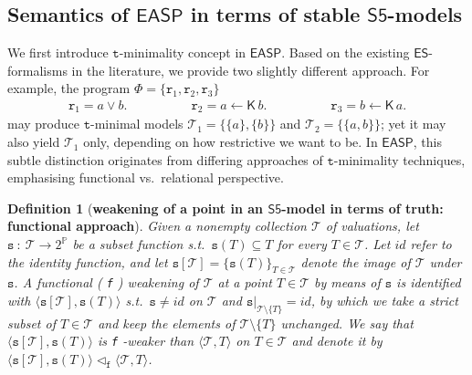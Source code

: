 \documentclass[submission,copyright,creativecommons]{eptcs}
\newcommand{\tuple}[1]  { \langle #1 \rangle }
\newcommand{\Prop}  { \mathbb{P} }
\newcommand\restr[2]  { \ensuremath{\left.#1\right|_{#2}} }
\newcommand{\suchthat}  { \ : \ }
\newcommand{\set}[1]  { \{ #1 \} }
\newcommand{\bigset}[1]  { \big\{ #1 \big\} }
\newcommand{\logic}[1]  { \ensuremath{\mathsf{#1}} }
\newcommand{\sfive}  { \logic{S5} }
\newcommand{\ES}  { \logic{ES} }
\newcommand{\EASP}  { \logic{EASP} }
\newcommand{\K}  { \mathsf{K} }
\newcommand{\weak}  { \texttt{s} }
\newcommand{\functional}  { \texttt{f} }
\newtheorem{definition}{Definition}
\begin{document}
\subsection{Semantics of \texorpdfstring{$\EASP$}{EASP} in terms of stable 
\texorpdfstring{$\sfive$}{sfive}-models}
\label{sec:Semantics.EpisASP.epistemic stable models}
We first introduce $\texttt{t}$-minimality concept in $\EASP$. Based on the existing 
$\ES$-formalisms in the literature, we provide two slightly different approach.
For example, the program $\Phi=\set{\mathtt{r}_1,\mathtt{r}_2,\mathtt{r}_3}$
\begin{align}
\label{ex: t-minimality slight difference}
\mathtt{r}_1 = a \lor b. \hspace{5em}
\mathtt{r}_2 = a \leftarrow \K\,b. \hspace{5em}
\mathtt{r}_3 = b \leftarrow \K\,a.
\end{align}
may produce $\texttt{t}$-minimal models 
$\mathcal T_1 = \set{ \set a , \set b }$ and $\mathcal T_2 = \set{ \set{a, b} }$; yet
it may also yield $\mathcal T_1$ only, depending on how restrictive we want to be.
In $\EASP$, this subtle distinction originates from differing approaches
of $\texttt{t}$-minimality techniques, 
emphasising functional vs.\ relational perspective.
%
\begin{definition}[\textbf{weakening of a point in an $\sfive$-model
in terms of truth: functional approach}]
\label{defn:weakening w.r.t. truth-functional} \normalfont
Given a nonempty collection $\mathcal T$ 
of valuations, let $\weak {\suchthat} \mathcal T \rightarrow 2^{\Prop}$ 
be a \emph{subset} 
function s.t.\ $\weak(T) \subseteq T$ for every $T \in \mathcal T$. 
Let $id$ refer to the identity function, and let
$\weak[\mathcal T]=\bigset{\weak(T)}_{\scriptscriptstyle{T\in \mathcal T}}$
denote the image of $\mathcal T$ under $\weak$.
A \emph{functional (\functional) weakening} of $\mathcal T$ 
at a point $T \in \mathcal T$ 
by means of $\weak$ is identified with $\tuple{\weak[\mathcal T], \weak(T)}$
s.t.\ $\weak \neq id$ on $\mathcal T$ and
$\restr{\weak}{ \mathcal T \setminus \set T}= id$, by which we take a strict subset of 
$T \in \mathcal T$ and keep the elements of $\mathcal T \setminus \set{T}$ unchanged.
We say that $\tuple{\weak[\mathcal T], \weak(T)}$ is \emph{\functional-weaker} 
than $\tuple{\mathcal T, T}$
on $T \in \mathcal T$ and denote it by $\tuple{\weak[\mathcal T], \weak(T)} \lhd_{\functional} \tuple{\mathcal T, T}$. 
\end{definition}
\end{document}
